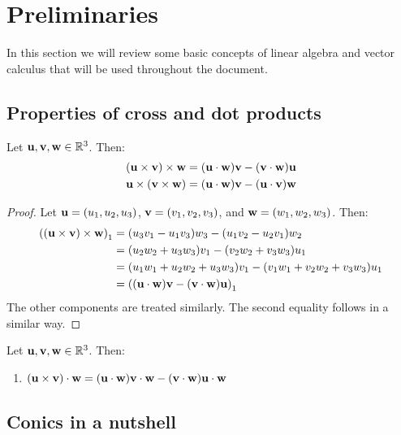 \documentclass[../main.tex]{subfiles}
\begin{document}
\section{Preliminaries}\label{sec:preliminaries}
In this section we will review some basic concepts of linear algebra and vector calculus that will be used throughout the document.
\subsection{Properties of cross and dot products}
\begin{proposition}
  \label{prop:triplecross}
  Let $\vf{u}, \vf{v}, \vf{w}\in\RR^3$. Then:
  \begin{align}
    (\vf{u}\times\vf{v})\times\vf{w} & =(\vf{u}\cdot\vf{w})\vf{v}-(\vf{v}\cdot\vf{w})\vf{u} \\
    \vf{u}\times(\vf{v}\times\vf{w}) & =(\vf{u}\cdot\vf{w})\vf{v}-(\vf{u}\cdot\vf{v})\vf{w}
  \end{align}
\end{proposition}
\begin{proof}
  Let $\vf{u}=(u_1,u_2,u_3)$, $\vf{v}=(v_1,v_2,v_3)$, and $\vf{w}=(w_1,w_2,w_3)$. Then:
  \begin{align*}
    {((\vf{u}\times\vf{v})\times\vf{w})}_1 & =(u_3v_1-u_1v_3)w_3-(u_1v_2-u_2v_1)w_2                     \\
                                           & =(u_2w_2+u_3w_3)v_1-(v_2w_2+v_3w_3)u_1                     \\
                                           & =(u_1w_1+u_2w_2+u_3w_3)v_1-(v_1w_1+v_2w_2+v_3w_3)u_1       \\
                                           & ={((\vf{u}\cdot\vf{w})\vf{v}-(\vf{v}\cdot\vf{w})\vf{u})}_1
  \end{align*}
  The other components are treated similarly. The second equality follows in a similar way.
\end{proof}
\begin{proposition}
  Let $\vf{u}, \vf{v}, \vf{w}\in\RR^3$. Then:
  \begin{enumerate}
    \item $(\vf{u}\times\vf{v})\cdot\vf{w}=(\vf{u}\cdot\vf{w})\vf{v}\cdot\vf{w}-(\vf{v}\cdot\vf{w})\vf{u}\cdot\vf{w}$
  \end{enumerate}
\end{proposition}
\subsection{Conics in a nutshell}
\end{document}
